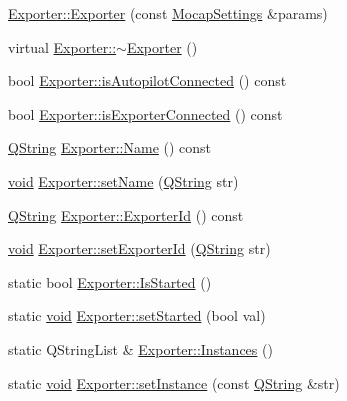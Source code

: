 \begin{DoxyCompactItemize}
\item 
\hyperlink{group___mo_cap_plugin_ga3c11abedc19c26ed0e0212e152f10685}{\-Exporter\-::\-Exporter} (const \hyperlink{group___mo_cap_plugin_ga6083347a5b3eb70e360f599354dc0f0b}{\-Mocap\-Settings} \&params)
\item 
virtual \hyperlink{group___mo_cap_plugin_ga44f24686958e01a543fd8b68b392658a}{\-Exporter\-::$\sim$\-Exporter} ()
\item 
bool \hyperlink{group___mo_cap_plugin_gaec7e0cea763639d6f79c4f61e9e78375}{\-Exporter\-::is\-Autopilot\-Connected} () const 
\item 
bool \hyperlink{group___mo_cap_plugin_gad9cd5c117dc3025d1ef55ba560b9e7c4}{\-Exporter\-::is\-Exporter\-Connected} () const 
\item 
\hyperlink{group___u_a_v_objects_plugin_gab9d252f49c333c94a72f97ce3105a32d}{\-Q\-String} \hyperlink{group___mo_cap_plugin_gaad282295f6b9ba8910db1a11c56d1998}{\-Exporter\-::\-Name} () const 
\item 
\hyperlink{group___u_a_v_objects_plugin_ga444cf2ff3f0ecbe028adce838d373f5c}{void} \hyperlink{group___mo_cap_plugin_ga09d765021a9a03276d14769f3ab7c43d}{\-Exporter\-::set\-Name} (\hyperlink{group___u_a_v_objects_plugin_gab9d252f49c333c94a72f97ce3105a32d}{\-Q\-String} str)
\item 
\hyperlink{group___u_a_v_objects_plugin_gab9d252f49c333c94a72f97ce3105a32d}{\-Q\-String} \hyperlink{group___mo_cap_plugin_gaebb24e563941debf0abc1897ef3c89e3}{\-Exporter\-::\-Exporter\-Id} () const 
\item 
\hyperlink{group___u_a_v_objects_plugin_ga444cf2ff3f0ecbe028adce838d373f5c}{void} \hyperlink{group___mo_cap_plugin_gaf8c44fde7b72a5f5658d47408b806b62}{\-Exporter\-::set\-Exporter\-Id} (\hyperlink{group___u_a_v_objects_plugin_gab9d252f49c333c94a72f97ce3105a32d}{\-Q\-String} str)
\item 
static bool \hyperlink{group___mo_cap_plugin_ga4b693d27267a22d345082b85e2ebe71e}{\-Exporter\-::\-Is\-Started} ()
\item 
static \hyperlink{group___u_a_v_objects_plugin_ga444cf2ff3f0ecbe028adce838d373f5c}{void} \hyperlink{group___mo_cap_plugin_ga7b3b24d7f35ac822cf8414afbf88854d}{\-Exporter\-::set\-Started} (bool val)
\item 
static \-Q\-String\-List \& \hyperlink{group___mo_cap_plugin_ga31d137dece30e0f249c4162df4b5b105}{\-Exporter\-::\-Instances} ()
\item 
static \hyperlink{group___u_a_v_objects_plugin_ga444cf2ff3f0ecbe028adce838d373f5c}{void} \hyperlink{group___mo_cap_plugin_ga8a5fd7b06f55301b2683b72e15ffdd1e}{\-Exporter\-::set\-Instance} (const \hyperlink{group___u_a_v_objects_plugin_gab9d252f49c333c94a72f97ce3105a32d}{\-Q\-String} \&str)

\end{DoxyCompactItemize}
